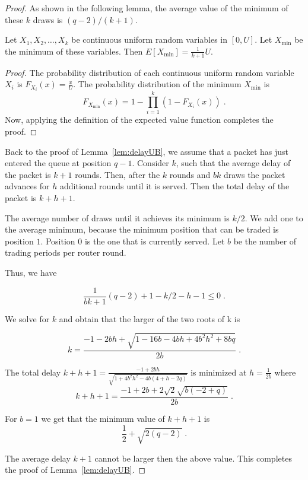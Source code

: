 \documentclass[letterpaper,10pt]{llncs}
\begin{document}
\begin{proof}
\noindent
As shown in the following lemma, the average value of the minimum of these $k$ draws is $(q-2)/(k+1)$.
\begin{lemma}
\label{lem:min}
Let $X_1, X_2, \dots, X_k$ be continuous uniform random variables in $[0,U]$. 
Let $X_{\min}$ be the minimum of these variables. Then $E[X_{\min}] = \frac{1}{k+1} U$.
\end{lemma}

\begin{proof}
The probability distribution of each continuous uniform random variable $X_i$ is $F_{X_i}(x) = \frac{x}{U}$.
The probability distribution of the minimum $X_{\min}$ is 
\[F_{X_{\min}}(x) = 1 - \prod_{i=1}^k \left( 1-F_{X_i}(x)\right) \; . \] 
Now, applying the definition of the expected value function completes the proof.
\end{proof}

Back to the proof of Lemma~\ref{lem:delayUB}, we assume that a packet has just entered the 
queue at position $q-1$.
Consider $k$, such that the average delay of the packet is $k+1$ rounds. 
Then, after the $k$ rounds and $b k$ draws the packet advances for $h$ additional rounds
until it is served. Then the total delay of the packet is $k+h+1$. 

The average number of draws until it achieves its minimum is $k/2$.
We add one to the average minimum, because the minimum position that can be traded 
is position $1$. Position $0$ is the one that is currently served.
Let $b$ be the number of trading periods per router round. 

\noindent
Thus, we have

\[ \frac{1}{b k + 1} (q-2) + 1 - k/2 - h - 1 \leq 0 \; .\]

\noindent
We solve for $k$ and obtain that the larger of the two roots of k is 

\[k = \frac{-1-2 b h+\sqrt{1-16 b-4 b h+4 b^2 h^2+8 b q}}{2 b} \; . \]

\noindent
The total delay $k+h+1 = \frac{-1+2 b h}{\sqrt{1+4 b^2 h^2-4 b (4+h-2 q)}}$
is minimized at $h = \frac{1}{2b}$ where
\[
k+h+1 = \frac{-1+2 b+2 \sqrt{2} \sqrt{b (-2+q)}}{2 b} \; .
\]

\noindent
For $b=1$ we get that the minimum value of $k+h+1$ is 
\[
\frac{1}{2}+\sqrt{2(q-2)} \; . 
\]

\noindent
The average delay $k+1$ cannot be larger then the above value. This completes the proof of Lemma~\ref{lem:delayUB}.
\end{proof}
\end{document}
